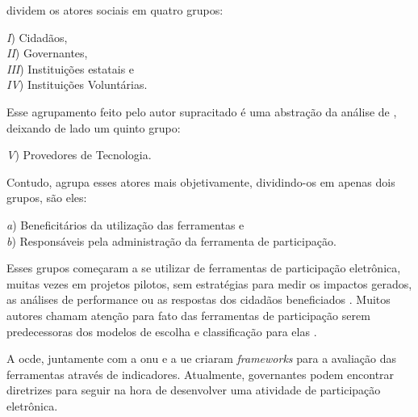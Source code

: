 \par
{} dividem os atores sociais em quatro grupos: 

\begin{minipage}{.66\textwidth}	
   \textit{I}) Cidadãos, \\
   \textit{II}) Governantes, \\
   \textit{III}) Instituições estatais e \\
   \textit{IV}) Instituições Voluntárias. \\
\end{minipage}

\par
Esse agrupamento feito pelo autor supracitado é uma abstração da análise de , deixando de lado um quinto grupo:

\par
\textit{V}) Provedores de Tecnologia.

\par
Contudo,  agrupa esses atores mais objetivamente, dividindo-os em apenas dois grupos, são eles:\\

\begin{minipage}{.75\textwidth}	
   \textit{a}) Beneficitários da utilização das ferramentas e \\
   \textit{b}) Responsáveis pela administração da ferramenta de participação.  \\
\end{minipage}

Esses grupos começaram a se utilizar de ferramentas de participação eletrônica, muitas vezes em projetos pilotos,
sem estratégias para medir os impactos gerados, as análises de performance ou as respostas dos cidadãos beneficiados \cite{macintosh2008democracy}.
Muitos autores chamam atenção para fato das ferramentas de participação serem predecessoras dos modelos de escolha e classificação para elas 
\cite{millard2006egovernance,macintosh2008democracy,reddick2012public}.

\par
A \acrfull{ocde}, juntamente com a \acrshort{onu} e a \acrfull{ue} criaram \textit{frameworks} para a avaliação das ferramentas através de indicadores. 
Atualmente, governantes podem encontrar diretrizes para seguir na hora de desenvolver uma atividade de participação eletrônica.

\newpage
